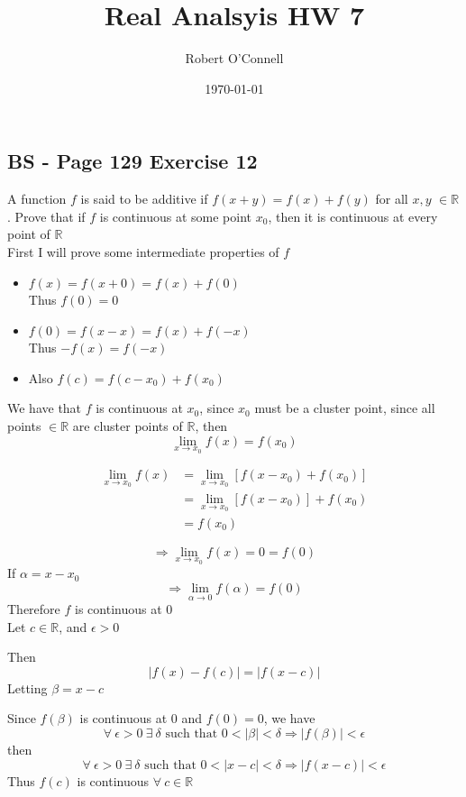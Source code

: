 \documentclass{article}
\title{\textbf{Real Analsyis HW 7}}
\author{Robert O'Connell}
\date{\today}
\begin{document}
\maketitle
\vspace{5mm}

\subsection*{BS - Page 129 Exercise 12}
A function \(f\) is said to be additive if \(f(x + y) = f(x) + f(y)\) for all \(x , y\) 
\(\in \mathbb{R}\). Prove that if \(f\) is continuous at some point \(x_0\), then 
it is continuous at every point of \(\mathbb{R}\)
\\

First I will prove some intermediate properties of \(f\)

\begin{itemize}
    \item \(f(x) = f(x + 0) = f(x) + f(0)\) \\
    Thus \(f(0) = 0\)
    \item \(f(0) = f(x -x) = f(x) + f(-x)\) \\
    Thus \(-f(x) = f(-x)\)
    \item Also \(f(c) = f(c - x_0) + f(x_0)\)
\end{itemize}

We have that \(f\) is continuous at \(x_0\), since \(x_0\) must be a cluster point, since all points \(\in \mathbb{R}\)
are cluster points of \(\mathbb{R}\), then 
\[
\lim_{x\to x_0}{f(x)}  = f(x_0)
\]


\begin{align*}
    \lim_{x\to x_0}{f(x)}  &= \lim_{x\to x_0}{[f(x- x_0) + f(x_0)]} \\
    &= \lim_{x\to x_0}{[f(x - x_0)]}  + f(x_0) \\
    &= f(x_0)
\end{align*}

\[
\Rightarrow \lim_{x\to x_0}{f(x)} = 0 = f(0)
\]
If \(\alpha = x - x_0\)
\[
\Rightarrow \lim_{\alpha \to 0}{f(\alpha)} = f(0)
\]
Therefore \(f\) is continuous at \(0\)
\\

Let \(c \in \mathbb{R}\), and \(\epsilon > 0\)

Then
\[
|f(x)- f(c)| = |f(x-c)|
\]
Letting \(\beta = x-c\)

Since \(f(\beta)\) is continuous at \(0\) and \(f(0) = 0\), we have
\[
\forall \ \epsilon > 0 \ \exists \ \delta \text{ such that } 0 < |\beta| < \delta \Rightarrow |f(\beta)| < \epsilon 
\]
then
\[
\forall \ \epsilon > 0 \ \exists \ \delta \text{ such that } 0 < |x-c| < \delta \Rightarrow |f(x-c)| < \epsilon 
\]
Thus \(f(c)\) is continuous \(\forall \ c \in \mathbb{R}\)
\end{document}
